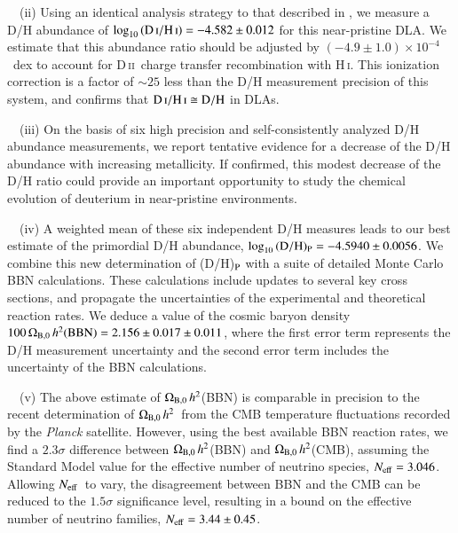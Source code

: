 \documentclass[12pt,preprint,useAMS,usenatbib]{emulateapj}
\newcommand{\neff}{$N_{\rm eff}$}
\newcommand{\obhh}{$\Omega_{\rm B,0}\,h^{2}$}
\newcommand{\DII}{\textrm{D}\,\textsc{ii}}
\newcommand{\HI}{\textrm{H}\,\textsc{i}}
\begin{document}
\smallskip

\noindent ~~(ii) Using an identical analysis strategy to that described
in \citet{Coo14}, we measure a D/H abundance of
$\log_{10}\,({\rm D\,\textsc{i}/H\,\textsc{i}}) = -4.582\pm0.012$
for this near-pristine DLA. We estimate that this abundance
ratio should be adjusted
by $(-4.9\pm1.0)\times10^{-4}$~dex to account for \DII\ charge
transfer recombination with \HI. This ionization correction
is a factor of $\sim25$ less than the D/H measurement
precision of this system, and confirms that 
${\rm D\,\textsc{i}/H\,\textsc{i}}\cong{\rm D/H}$ in DLAs.

\smallskip

\noindent ~~(iii) On the basis of six high precision and self-consistently
analyzed D/H abundance measurements, we report tentative evidence
for a decrease of the D/H abundance with increasing metallicity. If confirmed,
this modest decrease of the D/H ratio could provide an important opportunity
to study the chemical evolution of deuterium in near-pristine environments.

\smallskip

\noindent ~~(iv) A weighted mean of these six independent D/H measures
leads to our best estimate of the primordial D/H abundance,
$\log_{10}\,({\rm D/H})_{\rm P} = -4.5940\pm0.0056$. We combine
this new determination of (D/H)$_{\rm P}$ with a suite of detailed
Monte Carlo BBN calculations. These calculations include updates
to several key cross sections, and propagate the uncertainties of
the experimental and theoretical reaction rates.
We deduce a value of the cosmic baryon
density $100\,\Omega_{\rm B,0}\,h^{2}({\rm BBN}) = 2.156\pm0.017\pm0.011$,
where the first error term represents the D/H measurement uncertainty
and the second error term includes the uncertainty of the BBN calculations.

\smallskip

\noindent ~~(v) The above estimate of \obhh(BBN) is comparable in
precision to the recent determination of \obhh\ from the
CMB temperature fluctuations
recorded by the \textit{Planck} satellite. However, using the best
available BBN reaction rates, we find a $2.3\sigma$ difference
between \obhh(BBN) and \obhh(CMB), assuming the Standard
Model value for the effective number of neutrino species,
$N_{\rm eff}=3.046$. Allowing \neff\ to vary, the disagreement
between BBN and the CMB can be reduced to the $1.5\sigma$
significance level, resulting in a bound on the effective number
of neutrino families, $N_{\rm eff} = 3.44\pm0.45$.
\end{document}
